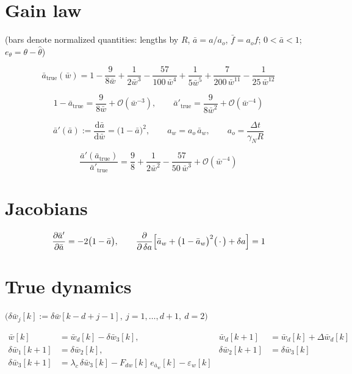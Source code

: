 \documentclass[11pt,a4paper,fontset=none]{ctexart}
\newcommand{\ba}{\bar{a}}
\newcommand{\bw}{\bar{w}}
\begin{document}
\section{Gain law}

(bars denote normalized quantities: lengths by $R$, $\ba = a/a_o$,
$\bar{f} = a_o f$; $0 < \ba < 1$; $e_{\theta} = \theta - \hat{\theta}$)

\begin{equation*}
\ba_{\mathrm{true}}(\bw) = 1 - \frac{9}{8\bw} + \frac{1}{2\bw^{3}}
  - \frac{57}{100\,\bw^{4}} + \frac{1}{5\bw^{5}}
  + \frac{7}{200\,\bw^{11}} - \frac{1}{25\,\bw^{12}}
\end{equation*}

\begin{equation*}
1 - \ba_{\mathrm{true}} = \frac{9}{8\bw} + \mathcal{O}(\bw^{-3}),
\qquad
\ba'_{\mathrm{true}} = \frac{9}{8\bw^{2}} + \mathcal{O}(\bw^{-4})
\end{equation*}

\begin{equation*}
\ba'(\ba) := \frac{\mathrm{d}\ba}{\mathrm{d}\bw} = \bigl(1-\ba\bigr)^{2},
\qquad
a_w = a_o\,\ba_w , \qquad a_o = \frac{\Delta t}{\gamma_N R}
\end{equation*}

\begin{equation*}
\frac{\ba'(\ba_{\mathrm{true}})}{\ba'_{\mathrm{true}}}
  = \frac{9}{8} + \frac{1}{2\bw^{2}} - \frac{57}{50\,\bw^{3}}
  + \mathcal{O}(\bw^{-4})
\end{equation*}

\section{Jacobians}

\begin{equation*}
\frac{\partial \ba'}{\partial \ba} = -2\bigl(1-\ba\bigr),
\qquad
\frac{\partial}{\partial\,\delta a}
\Bigl[\ba_w + \bigl(1-\ba_w\bigr)^{2}\bigl(\,\cdot\,\bigr) + \delta a\Bigr] = 1
\end{equation*}

\section{True dynamics}

$\bigl(\delta\bw_j[k] := \delta\bw[k-d+j-1],\ j = 1,\dots,d+1,\ d = 2\bigr)$

\begin{align*}
\bw[k] &= \bw_d[k] - \delta\bw_3[k], &
\bw_d[k+1] &= \bw_d[k] + \Delta\bw_d[k] \\
\delta\bw_1[k+1] &= \delta\bw_2[k], &
\delta\bw_2[k+1] &= \delta\bw_3[k] \\
\delta\bw_3[k+1] &= \lambda_c\,\delta\bw_3[k] - F_{dw}[k]\,e_{\ba_w}[k]
  - \varepsilon_w[k]
\end{align*}
\end{document}
